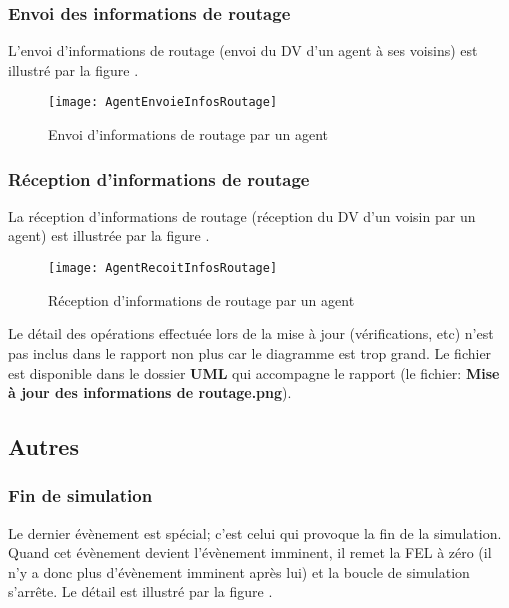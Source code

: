 \documentclass[a4paper,11pt]{article}
\begin{document}
\subsubsection{Envoi des informations de routage}
L'envoi d'informations de routage (envoi du DV d'un agent à ses voisins) est illustré par la figure .

\begin{figure}[h!t]
  \centering
    \texttt{[image: AgentEnvoieInfosRoutage]}
  \caption{Envoi d'informations de routage par un agent}
  \label{fig:agent-envoi-infos-routage}
\end{figure}





\subsubsection{Réception d'informations de routage}
La réception d'informations de routage (réception du DV d'un voisin par un agent) est illustrée par la figure .

\begin{figure}[h!t]
  \centering
    \texttt{[image: AgentRecoitInfosRoutage]}
  \caption{Réception d'informations de routage par un agent}
  \label{fig:agent-recoit-infos-routage}
\end{figure}

Le détail des opérations effectuée lors de la mise à jour (vérifications, etc) n'est pas inclus dans le rapport non plus car le diagramme est trop grand. Le fichier est disponible dans le dossier \textbf{UML} qui accompagne le rapport (le fichier: \textbf{Mise à jour des informations de routage.png}).













\subsection{Autres}

\subsubsection{Fin de simulation}
Le dernier évènement est spécial; c'est celui qui provoque la fin de la simulation. Quand cet évènement devient l'évènement imminent, il remet la FEL à zéro (il n'y a donc plus d'évènement imminent après lui) et la boucle de simulation s'arrête. Le détail est illustré par la figure .
\end{document}
